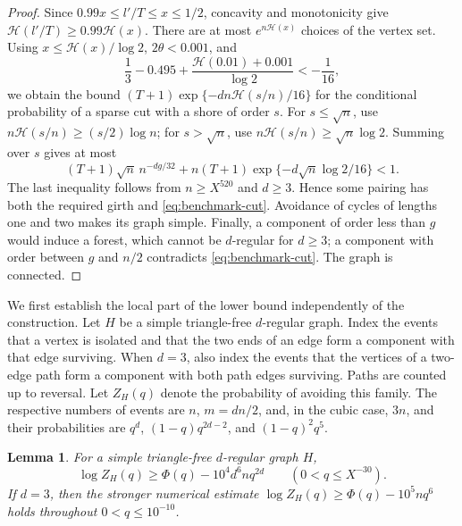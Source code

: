 \documentclass[11pt,reqno]{amsart}
\newtheorem{lemma}[theorem]{Lemma}
\theoremstyle{remark}
\numberwithin{equation}{section}
\begin{document}
\begin{proof}
Since $0.99x\le l'/T\le x\le1/2$, concavity and monotonicity give
$\mathcal H(l'/T)\ge0.99\mathcal H(x)$.  There are at most
$e^{n\mathcal H(x)}$ choices of the vertex set.  Using
$x\le\mathcal H(x)/\log2$, $2\theta<0.001$, and
\[
 \frac13-0.495+
 \frac{\mathcal H(0.01)+0.001}{\log2}< -\frac1{16},
\]
we obtain the bound
$(T+1)\exp\{-dn\mathcal H(s/n)/16\}$ for the conditional
probability of a sparse cut with a shore of order $s$.
For $s\le\sqrt n$, use
$n\mathcal H(s/n)\ge(s/2)\log n$; for $s>\sqrt n$, use
$n\mathcal H(s/n)\ge\sqrt n\log2$.  Summing over $s$ gives at most
\[
 (T+1)\sqrt n\,n^{-dg/32}
 +n(T+1)\exp\{-d\sqrt n\log2/16\}<1.
\]
The last inequality follows from $n\ge X^{520}$ and $d\ge3$.
Hence some pairing has both the required girth and
\eqref{eq:benchmark-cut}.  Avoidance of cycles of lengths one and
two makes its graph simple.  Finally, a component of order less than
$g$ would induce a forest, which cannot be $d$-regular for $d\ge3$;
a component with order between $g$ and $n/2$ contradicts
\eqref{eq:benchmark-cut}.  The graph is connected.
\end{proof}

We first establish the local part of the lower bound independently
of the construction.  Let $H$ be a simple triangle-free $d$-regular
graph.  Index the events that a vertex is isolated and that the two
ends of an edge form a component with that edge surviving.  When
$d=3$, also index the events that the vertices of a two-edge path
form a component with both path edges surviving.  Paths are counted
up to reversal.  Let $Z_H(q)$ denote the probability of avoiding
this family.  The respective numbers of events are $n$, $m=dn/2$,
and, in the cubic case, $3n$, and their probabilities are
$q^d$, $(1-q)q^{2d-2}$, and $(1-q)^2q^5$.

\begin{lemma}\label{lem:local-lower}
For a simple triangle-free $d$-regular graph $H$,
\begin{equation}\label{eq:lowerlog}
 \log Z_H(q)\ge \Phi(q)-10^4d^6nq^{2d}
 \qquad(0<q\le X^{-30}).
\end{equation}
If $d=3$, then the stronger numerical estimate
$\log Z_H(q)\ge\Phi(q)-10^5nq^6$ holds throughout
$0<q\le10^{-10}$.
\end{lemma}
\end{document}
